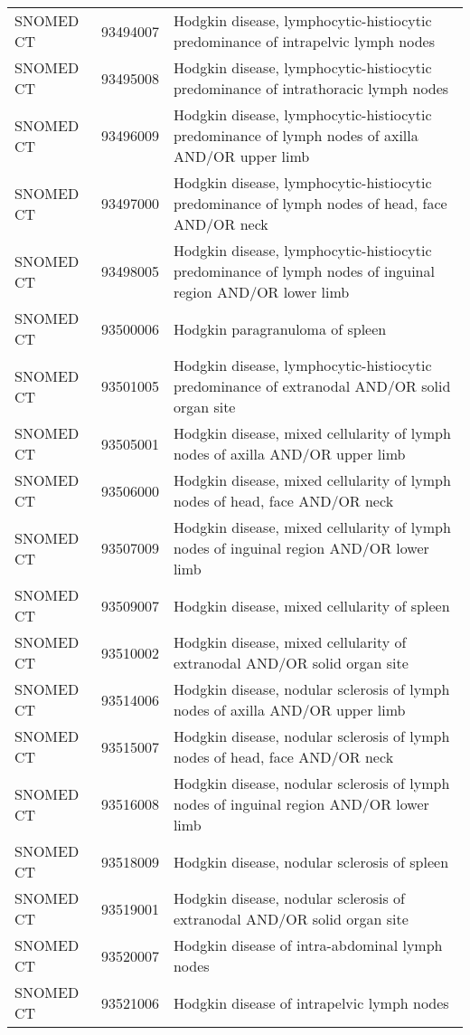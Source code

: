 \begin{longtable}{p{}p{}p{}}
  SNOMED CT & 93494007 & Hodgkin disease, lymphocytic-histiocytic predominance of intrapelvic lymph nodes \\ 
  SNOMED CT & 93495008 & Hodgkin disease, lymphocytic-histiocytic predominance of intrathoracic lymph nodes \\ 
  SNOMED CT & 93496009 & Hodgkin disease, lymphocytic-histiocytic predominance of lymph nodes of axilla AND/OR upper limb \\ 
  SNOMED CT & 93497000 & Hodgkin disease, lymphocytic-histiocytic predominance of lymph nodes of head, face AND/OR neck \\ 
  SNOMED CT & 93498005 & Hodgkin disease, lymphocytic-histiocytic predominance of lymph nodes of inguinal region AND/OR lower limb \\ 
  SNOMED CT & 93500006 & Hodgkin paragranuloma of spleen \\ 
  SNOMED CT & 93501005 & Hodgkin disease, lymphocytic-histiocytic predominance of extranodal AND/OR solid organ site \\ 
  SNOMED CT & 93505001 & Hodgkin disease, mixed cellularity of lymph nodes of axilla AND/OR upper limb \\ 
  SNOMED CT & 93506000 & Hodgkin disease, mixed cellularity of lymph nodes of head, face AND/OR neck \\ 
  SNOMED CT & 93507009 & Hodgkin disease, mixed cellularity of lymph nodes of inguinal region AND/OR lower limb \\ 
  SNOMED CT & 93509007 & Hodgkin disease, mixed cellularity of spleen \\ 
  SNOMED CT & 93510002 & Hodgkin disease, mixed cellularity of extranodal AND/OR solid organ site \\ 
  SNOMED CT & 93514006 & Hodgkin disease, nodular sclerosis of lymph nodes of axilla AND/OR upper limb \\ 
  SNOMED CT & 93515007 & Hodgkin disease, nodular sclerosis of lymph nodes of head, face AND/OR neck \\ 
  SNOMED CT & 93516008 & Hodgkin disease, nodular sclerosis of lymph nodes of inguinal region AND/OR lower limb \\ 
  SNOMED CT & 93518009 & Hodgkin disease, nodular sclerosis of spleen \\ 
  SNOMED CT & 93519001 & Hodgkin disease, nodular sclerosis of extranodal AND/OR solid organ site \\ 
  SNOMED CT & 93520007 & Hodgkin disease of intra-abdominal lymph nodes \\ 
  SNOMED CT & 93521006 & Hodgkin disease of intrapelvic lymph nodes \\ 

\end{longtable}
